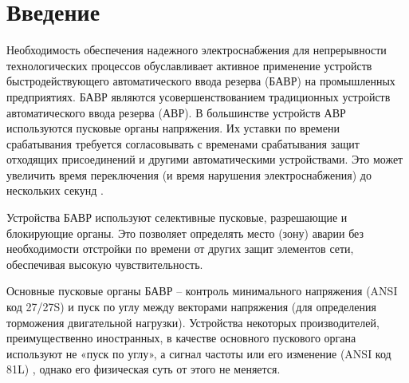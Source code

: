 
\section{Введение}\label{sec:ch1_intro}

Необходимость обеспечения надежного электроснабжения для непрерывности технологических
процессов обуславливает активное применение устройств быстродействующего автоматического
ввода резерва (БАВР) на промышленных предприятиях. БАВР являются усовершенствованием
традиционных устройств автоматического ввода резерва (АВР). В большинстве устройств АВР
используются пусковые органы напряжения. Их уставки по времени срабатывания требуется
согласовывать с временами срабатывания защит отходящих присоединений и другими
автоматическими устройствами. Это может увеличить время переключения (и время нарушения
электроснабжения) до нескольких секунд
\cite{bavr_bib_001_shabad_2003,bavr_bib_002_sto_2020}.\par\vspace{0.2cm}

Устройства БАВР используют селективные пусковые, разрешающие и блокирующие органы. Это
позволяет определять место (зону) аварии без необходимости отстройки по времени от
других защит элементов сети, обеспечивая высокую чувствительность.\par\vspace{0.2cm}

Основные пусковые органы БАВР
\cite{bavr_bib_003_operating_2023,bavr_bib_004_operating_2024,bavr_bib_005_phadke_2009,bavr_bib_006_the_1988,bavr_bib_007_the_nd,bavr_bib_008_instruction_nd,bavr_bib_009_instruction_nd}
– контроль минимального напряжения (ANSI код 27/27S) и пуск по углу между векторами
напряжения (для определения торможения двигательной нагрузки). Устройства некоторых
производителей, преимущественно иностранных, в качестве основного пускового органа
используют не «пуск по углу», а сигнал частоты или его изменение (ANSI код 81L)
\cite{bavr_bib_008_instruction_nd,bavr_bib_009_instruction_nd}, однако его физическая
суть от этого не меняется.\par\vspace{0.2cm}

